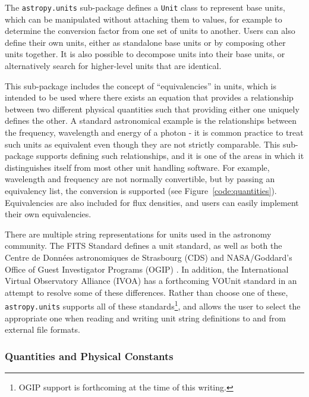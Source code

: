 \documentclass[traditabstract]{aa}
\begin{document}
The \texttt{astropy.units} sub-package defines a \texttt{Unit} class to represent base units, which can be manipulated
without attaching them to values, for example to determine the conversion
factor from one set of units to another. Users can also define their own
units, either as standalone base units or by composing other units together.
It is also possible to decompose units into their base units, or alternatively
search for higher-level units that are identical.

This sub-package includes the concept of ``equivalencies'' in units, which is
intended to be used where there exists an equation that provides a
relationship between two different physical quantities such that providing
either one uniquely defines the other. A standard astronomical example is the
relationships between the frequency, wavelength and energy of a photon - it is
common practice to treat such units as equivalent even though they are not
strictly comparable. This sub-package supports defining such relationships,
and it is one of the areas in which it distinguishes itself from most other
unit handling software. For example, wavelength and frequency are not normally
convertible, but by passing an equivalency list, the conversion is supported
(see Figure~\ref{code:quantities}). Equivalencies are also included for flux
densities, and users can easily implement their own equivalencies.

There are multiple string representations for units used in the astronomy
community. The FITS Standard \cite{fits2008} defines a unit standard, as well
as both the Centre de Donn\'ees astronomiques de Strasbourg (CDS)
\citep{ochsenbein2000cds} and NASA/Goddard's Office of Guest Investigator
Programs (OGIP) \citep{george1995ogip}. In addition, the International
Virtual Observatory Alliance (IVOA) has a forthcoming VOUnit standard
\citep{derriere2012vounit} in an attempt to resolve some of these differences.
Rather than choose one of these, \texttt{astropy.units} supports all of these
standards\footnote{OGIP support is forthcoming at the time of this writing.},
and allows the user to select the appropriate one when reading and writing
unit string definitions to and from external file formats.

\subsubsection{Quantities and Physical Constants}

\label{sec:quantities}
\end{document}
